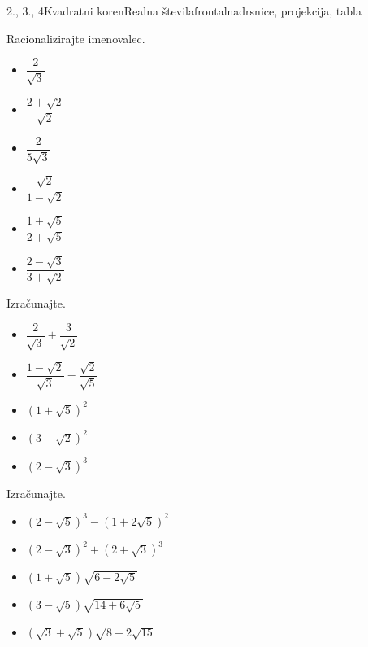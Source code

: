 \begin{priprava}{2., 3., 4}{}{Kvadratni koren}{Realna števila}{frontalna}{drsnice, projekcija, tabla}
\begin{multicols}{2}
        
            \begin{naloga}
                Racionalizirajte imenovalec.
                \begin{multicols}{2}
                \begin{itemize}
                        \item $\dfrac{2}{\sqrt{3}}$ 
                        \item $\dfrac{2+\sqrt{2}}{\sqrt{2}}$ 
                        \item $\dfrac{2}{5\sqrt{3}}$ 
                        \item $\dfrac{\sqrt{2}}{1-\sqrt{2}}$ 
                        \item $\dfrac{1+\sqrt{5}}{2+\sqrt{5}}$ 
                        \item $\dfrac{2-\sqrt{3}}{3+\sqrt{2}}$ 
                \end{itemize}
            \end{multicols}
            \end{naloga}
        


        
            \begin{naloga}
                Izračunajte.
                \begin{itemize}
                        \item $\dfrac{2}{\sqrt{3}}+\dfrac{3}{\sqrt{2}}$ 
                        \item $\dfrac{1-\sqrt{2}}{\sqrt{3}}-\dfrac{\sqrt{2}}{\sqrt{5}}$ 
                        \item $\left(1+\sqrt{5}\right)^2$ 
                        \item $\left(3-\sqrt{2}\right)^2$ 
                        \item $\left(2-\sqrt{3}\right)^3$ 
                \end{itemize}
            \end{naloga}
        


        
        
            \begin{naloga}
                Izračunajte.
                \begin{itemize}
                        \item $\left(2-\sqrt{5}\right)^3-\left(1+2\sqrt{5}\right)^2$ 
                        \item $\left(2-\sqrt{3}\right)^2+\left(2+\sqrt{3}\right)^3$ 
                        \item $\left(1+\sqrt{5}\right)\sqrt{6-2\sqrt{5}}$ 
                        \item $\left(3-\sqrt{5}\right)\sqrt{14+6\sqrt{5}}$ 
                        \item $\left(\sqrt{3}+\sqrt{5}\right)\sqrt{8-2\sqrt{15}}$ 
                \end{itemize}
            \end{naloga}


\end{multicols}
\end{priprava}
